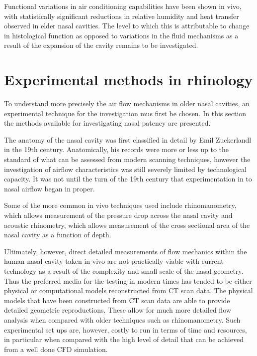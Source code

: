 Functional variations in air conditioning capabilities have been shown in vivo\cite{Lindemann2008}, with statistically significant reductions in relative humidity and heat transfer observed in elder nasal cavities. The level to which this is attributable to change in histological function as opposed to variations in the fluid mechanisms as a result of the expansion of the cavity remains to be investigated.

 \section{Experimental methods in rhinology}
 
To understand more precisely the air flow mechanisms in older nasal cavities, an experimental technique for the investigation mus first be chosen. In this section the methods available for investigating nasal patency are presented.

The anatomy of the nasal cavity was first classified in detail by Emil Zuckerlandl in the 19th century\cite{Stammberger1989}. Anatomically, his records were more or less up to the standard of what can be assessed from modern scanning techniques\cite{Stammberger1989}, however the investigation of airflow characteristics was still severely limited by technological capacity\cite{Eccles2000}. It was not until the turn of the 19th century that experimentation in to nasal airflow began in proper\cite{Eccles2000}. 

Some of the more common in vivo techniques used include rhinomanometry, which allows measurement of the pressure drop across the nasal cavity\cite{Hilberg1989} and acoustic rhinometry, which allows measurement of the cross sectional area of the nasal cavity as a function of depth\cite{Hilberg1989}. 

Ultimately, however, direct detailed measurements of flow mechanics within the human nasal cavity taken in vivo are not practically viable with current technology as a result of the complexity and small scale of the nasal geometry\cite{Doorly2008c}. Thus the preferred media for the testing in modern times has tended to be either physical or computational models reconstructed from CT scan data\cite{Doorly2008c}. The physical models that have been constructed from CT scan data are able to provide detailed geometric reproductions. These allow for much more detailed flow analysis when compared with older techniques such as rhinomanometry\cite{Ma2009}. Such experimental set ups are, however, costly to run in terms of time and resources, in particular when compared with the high level of detail that can be achieved from a well done CFD simulation\cite{Ma2009}.

